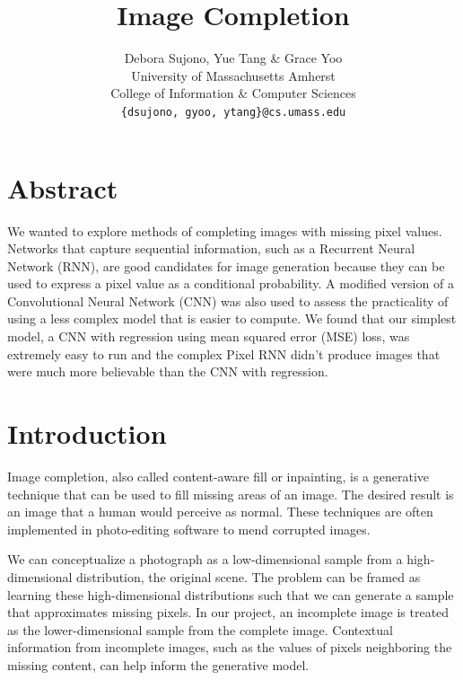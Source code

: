 \documentclass[10pt,twocolumn,letterpaper]{article}
\begin{document}
\title{Image Completion}

\author{Debora Sujono, Yue Tang \& Grace Yoo \\ 
University of Massachusetts Amherst \\ 
College of Information \& Computer Sciences \\
{\tt\small \{dsujono, gyoo, ytang\}@cs.umass.edu} \\
}

\maketitle

\section{Abstract} 
We wanted to explore methods of completing images with missing pixel values. Networks that capture sequential information, such as a Recurrent Neural Network (RNN), are good candidates for image generation because they can be used to express a pixel value as a conditional probability. A modified version of a Convolutional Neural Network (CNN) was also used to assess the practicality of using a less complex model that is easier to compute. We found that our simplest model, a CNN with regression using mean squared error (MSE) loss, was extremely easy to run and the complex Pixel RNN didn’t produce images that were much more believable than the CNN with regression.

\section{Introduction}
Image completion, also called content-aware fill or inpainting, is a generative technique that can be used to fill missing areas of an image. The desired result is an image that a human would perceive as normal. These techniques are often implemented in photo-editing software to mend corrupted images.

\par We can conceptualize a photograph as a low-dimensional sample from a high-dimensional distribution, the original scene. The problem can be framed as learning these high-dimensional distributions such that we can generate a sample that approximates missing pixels. In our project, an incomplete image is treated as the lower-dimensional sample from the complete image. Contextual information from incomplete images, such as the values of pixels neighboring the missing content, can help inform the generative model. \\
\end{document}
